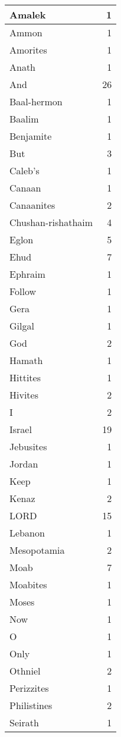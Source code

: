 \begin{center}
\begin{longtable}{l|r}
\hline \hline
\endlastfoot
Amalek & 1 \\ \hline
Ammon & 1 \\ \hline
Amorites & 1 \\ \hline
Anath & 1 \\ \hline
And & 26 \\ \hline
Baal-hermon & 1 \\ \hline
Baalim & 1 \\ \hline
Benjamite & 1 \\ \hline
But & 3 \\ \hline
Caleb's & 1 \\ \hline
Canaan & 1 \\ \hline
Canaanites & 2 \\ \hline
Chushan-rishathaim & 4 \\ \hline
Eglon & 5 \\ \hline
Ehud & 7 \\ \hline
Ephraim & 1 \\ \hline
Follow & 1 \\ \hline
Gera & 1 \\ \hline
Gilgal & 1 \\ \hline
God & 2 \\ \hline
Hamath & 1 \\ \hline
Hittites & 1 \\ \hline
Hivites & 2 \\ \hline
I & 2 \\ \hline
Israel & 19 \\ \hline
Jebusites & 1 \\ \hline
Jordan & 1 \\ \hline
Keep & 1 \\ \hline
Kenaz & 2 \\ \hline
LORD & 15 \\ \hline
Lebanon & 1 \\ \hline
Mesopotamia & 2 \\ \hline
Moab & 7 \\ \hline
Moabites & 1 \\ \hline
Moses & 1 \\ \hline
Now & 1 \\ \hline
O & 1 \\ \hline
Only & 1 \\ \hline
Othniel & 2 \\ \hline
Perizzites & 1 \\ \hline
Philistines & 2 \\ \hline
Seirath & 1 \\ \hline

\end{longtable}
\end{center}
